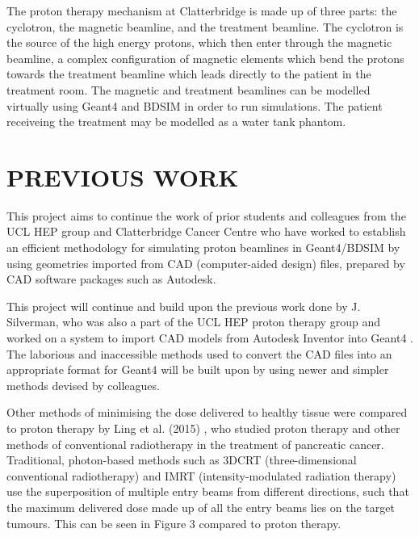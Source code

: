 \documentclass[a4paper, 12pt, conference]
{ieeeconf}      %
\begin{document}
The proton therapy mechanism at Clatterbridge is made up of three parts: the cyclotron, the magnetic beamline, and the treatment beamline. The cyclotron is the source of the high energy protons, which then enter through the magnetic beamline, a complex configuration of magnetic elements which bend the protons towards the treatment beamline which leads directly to the patient in the treatment room. The magnetic and treatment beamlines can be modelled virtually using Geant4 and BDSIM in order to run simulations. The patient receiveing the treatment may be modelled as a water tank phantom.


\section{PREVIOUS WORK}

This project aims to continue the work of prior students and colleagues from the UCL HEP group and Clatterbridge Cancer Centre who have worked to establish an efficient methodology for simulating proton beamlines in Geant4/BDSIM by using geometries imported from CAD (computer-aided design) files, prepared by CAD software packages such as Autodesk.

This project will continue and build upon the previous work done by J. Silverman, who was also a part of the UCL HEP proton therapy group and worked on a system to import CAD models from Autodesk Inventor into Geant4 \cite{silverman}. The laborious and inaccessible methods used to convert the CAD files into an appropriate format for Geant4 will be built upon by using newer and simpler methods devised by colleagues. 



Other methods of minimising the dose delivered to healthy tissue were compared to proton therapy by Ling et al. (2015) \cite{ling}, who studied proton therapy and other methods of conventional radiotherapy in the treatment of pancreatic cancer. Traditional, photon-based methods such as 3DCRT (three-dimensional conventional radiotherapy) and IMRT (intensity-modulated radiation therapy) use the superposition of multiple entry beams from different directions, such that the maximum delivered dose made up of all the entry beams lies on the target tumours. This can be seen in Figure 3 compared to proton therapy. 
\end{document}
